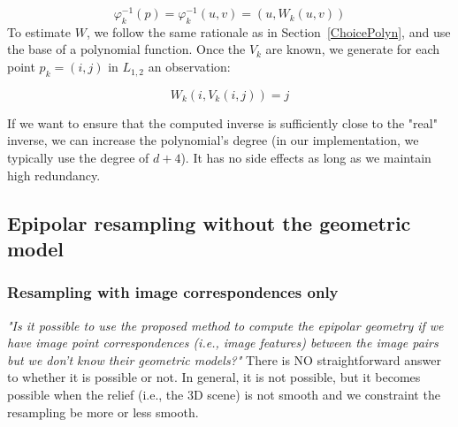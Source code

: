 \documentclass{ipol}
\newcommand{\er}[1]{\textcolor{orange}{#1}}
\begin{document}
\begin{equation}
  \varphi^{-1}_k(p) = \varphi^{-1}_k(u,v) = (u,W_k(u,v))  
\end{equation}
%
To estimate  $W$, we follow the same rationale as in Section~\ref{ChoicePolyn}, and
use the base of a polynomial function. Once the $V_k$ are known, we generate
for each point $p_k=(i,j)$ in $L_{1,2}$ an observation:

\begin{equation}
   W_k(i,V_k(i,j))  = j \label{InverseEpip}
\end{equation}

If we want to ensure that the computed inverse is sufficiently close
to the "real" inverse, we can increase the polynomial's degree (in our implementation, we typically use the degree of $d+4$). It has no side effects as long as we maintain high redundancy.



\subsection{Epipolar resampling without the geometric model}
\label{SecEpipNoModel}

\subsubsection{Resampling with image correspondences only}

\label{EpipTieP}

\emph{"Is it possible to use
the proposed method to compute the epipolar geometry
if we have image point correspondences (i.e., image features) between the image pairs but we don't know their geometric models?"} There is {NO}
 straightforward answer to whether it is possible or not. In general, it is not possible,
but it becomes possible when the relief (i.e., the 3D scene) is not smooth and we constraint the resampling be more or less smooth.
%
\end{document}
